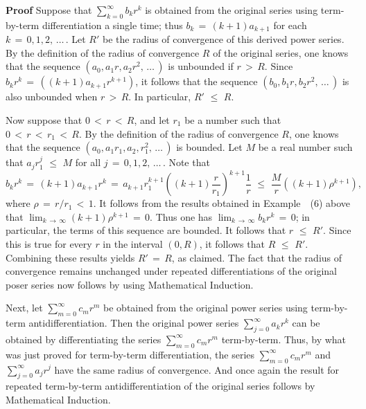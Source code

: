 \V

        {\bf Proof} Suppose that $\sum_{k=0}^{{\infty}} b_{k}r^{k}$ is obtained from the original series using term-by-term differentiation a single time;
    thus $b_{k} \,=\, (k+1)a_{k+1}$ for each $k \,=\, 0,1,2,\,{\ldots}\,$.
    Let $R'$ be the radius of convergence of this derived power series.
    By the definition of the radius of convergence $R$ of the original series, one knows that the sequence
    $(a_{0}, a_{1}r, a_{2}r^{2},\,{\ldots}\,)$ is unbounded if $r\,>\,R$. Since $b_{k}r^{k} \,=\, \left((k+1)a_{k+1}r^{k+1}\right)$,
    it follows that the sequence $(b_{0}, b_{1}r, b_{2}r^{2},\,{\ldots}\,)$ is also unbounded when $r\,>\,R$.
    In particular, $R'\,\,{\leq}\,\,R$.

    Now suppose that $0\,<\,r\,<\,R$, and let $r_{1}$ be a number such that $0\,<\,r\,<\,r_{1}\,<\,R$.
    By the definition of the radius of convergence $R$, one knows that the sequence $(a_{0}, a_{1}r_{1}, a_{2},r_{1}^{2},\,{\ldots}\,)$ is bounded.
    Let $M$ be a real number such that $a_{j}r_{1}^{j}\,\,{\leq}\,\,M$ for all $j \,=\, 0,1,2,\,{\ldots}\,$.
    Note that
        \begin{displaymath}
        b_{k}r^{k} \,=\, (k+1)a_{k+1}r^{k} \,=\, a_{k+1}r_{1}^{k+1} \left((k+1)\frac{r}{r_{1}}\right)^{k+1}\frac{1}{r} 
    \,\,{\leq}\,\,\frac{M}{r}\left((k+1){\rho}^{k+1}\right),
        \end{displaymath}
    where ${\rho} \,=\, r/r_{1}\,<\,1$. It follows from the results obtained in Example~~(6) above that $\lim_{k \,{\rightarrow}\, {\infty}} (k+1){\rho}^{k+1} \,=\, 0$.
    Thus one has $\lim_{k \,{\rightarrow}\, {\infty}} b_{k}r^{k} \,=\, 0$; in particular, the terms of this sequence are bounded.
    It follows that $r\,\,{\leq}\,\,R'$. Since this is true for every $r$ in the interval $(0,R)$, it follows that $R\,\,{\leq}\,\,R'$.
    Combining these results yields $R' \,=\, R$, as claimed. The fact that the radius of convergence remains unchanged under repeated differentiations of the original poser series now follows by using Mathematical Induction.

        Next, let $\sum_{m=0}^{{\infty}} c_{m}r^{m}$ be obtained from the original power series using term-by-term antidifferentiation.
    Then the original power series $\sum_{j=0}^{{\infty}} a_{k}r^{k}$ can be obtained by differentiating the series $\sum_{m=0}^{{\infty}} c_{m}r^{m}$ term-by-term.
    Thus, by what was just proved for term-by-term differentiation, the series $\sum_{m=0}^{{\infty}} c_{m}r^{m}$ and $\sum_{j=0}^{{\infty}} a_{j}r^{j}$ have the same radius of convergence.
    And once again the result for repeated term-by-term antidifferentiation of the original series follows by Mathematical Induction.


